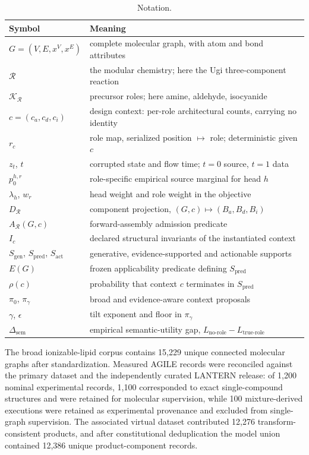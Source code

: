 \documentclass{article}
\makeatletter
\newcommand{\EnumSize}{12{,}276}
\newcommand{\MeasuredLipids}{1{,}100}
\newcommand{\Sgen}{\ensuremath{S_{\mathrm{gen}}}}
\newcommand{\Spred}{\ensuremath{S_{\mathrm{pred}}}}
\newcommand{\Sact}{\ensuremath{S_{\mathrm{act}}}}
\newcommand{\Dsem}{\ensuremath{\Delta_{\mathrm{sem}}}}
\newcommand{\rolemap}{\ensuremath{r_c}}
\newcommand{\decomp}{\ensuremath{D_{\mathcal{R}}}}
\def\paragraph{\@startsection{paragraph}{4}{\z@}{0.6ex plus 0.2ex minus .1ex}{-1em}{\normalsize\bf}}
\makeatother
\begin{document}
\begin{table}[h]
\centering
\caption{Notation.}
\label{tab:notation}
\small
\begin{tabular}{@{}lp{9.6cm}@{}}
\toprule
Symbol & Meaning \\
\midrule
$G = (V,E,x^V,x^E)$ & complete molecular graph, with atom and bond attributes \\
$\mathcal{R}$ & the modular chemistry; here the Ugi three-component reaction \\
$\mathcal{K}_{\mathcal{R}}$ & precursor roles; here amine, aldehyde, isocyanide \\
$c = (c_a, c_d, c_i)$ & design context: per-role architectural counts, carrying no identity \\
\rolemap{} & role map, serialized position $\mapsto$ role; deterministic given $c$ \\
$z_t$, $t$ & corrupted state and flow time; $t=0$ source, $t=1$ data \\
$p_0^{h,r}$ & role-specific empirical source marginal for head $h$ \\
$\lambda_h$, $w_r$ & head weight and role weight in the objective \\
\decomp{} & component projection, $(G,c) \mapsto (B_a, B_d, B_i)$ \\
$A_{\mathcal{R}}(G,c)$ & forward-assembly admission predicate \\
$I_c$ & declared structural invariants of the instantiated context \\
\Sgen{}, \Spred{}, \Sact{} & generative, evidence-supported and actionable supports \\
$E(G)$ & frozen applicability predicate defining \Spred{} \\
$\rho(c)$ & probability that context $c$ terminates in \Spred{} \\
$\pi_0$, $\pi_\gamma$ & broad and evidence-aware context proposals \\
$\gamma$, $\epsilon$ & tilt exponent and floor in $\pi_\gamma$ \\
\Dsem{} & empirical semantic-utility gap, $L_{\text{no-role}} - L_{\text{true-role}}$ \\
\bottomrule
\end{tabular}
\end{table}

\paragraph{Corpora.}
The broad ionizable-lipid corpus contains 15,229 unique connected molecular graphs after
standardization. Measured AGILE records were reconciled against the primary dataset and the
independently curated LANTERN release: of 1,200 nominal experimental records, \MeasuredLipids{}
corresponded to exact single-compound structures and were retained for molecular supervision, while
100 mixture-derived executions were retained as experimental provenance and excluded from
single-graph supervision. The associated virtual dataset contributed \EnumSize{} transform-consistent
products, and after constitutional deduplication the model union contained 12,386 unique
product-component records.
\end{document}
